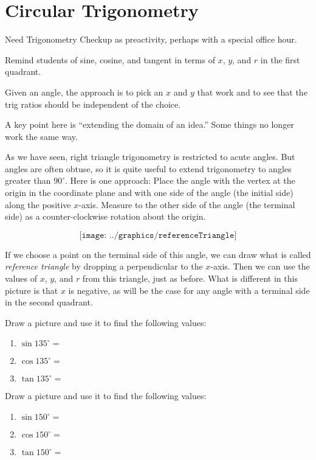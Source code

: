 \newpage 

\section{Circular Trigonometry}
\begin{teachingnote}
Need Trigonometry Checkup as preactivity, perhaps with a special office hour.  

Remind students of sine, cosine, and tangent in terms of $x$, $y$, and $r$ in the first quadrant.  

Given an angle, the approach is to pick an $x$ and $y$ that work and to see that the trig ratios should be independent of the choice.  

A key point here is ``extending the domain of an idea.''  Some things no longer work the same way.
\end{teachingnote}

As we have seen, right triangle trigonometry is restricted to acute angles.  But angles are often obtuse, so it is quite useful to extend trigonometry to angles greater than $90^\circ$.  Here is one approach:  Place the angle with the vertex at the origin in the coordinate plane and with one side of the angle (the initial side) along the positive $x$-axis.  
Measure to the other side of the angle (the terminal side) as a counter-clockwise rotation about the origin.   

\[
\texttt{[image: ../graphics/referenceTriangle]}
\]

If we choose a point on the terminal side of this angle, we can draw what is called \emph{reference triangle} by dropping a perpendicular to the $x$-axis.  Then we can use the values of $x$, $y$, and $r$ from this triangle, just as before.  What is different in this picture is that $x$ is negative, as will be the case for any angle with a terminal side in the second quadrant.  


\begin{prob}
Draw a picture and use it to find the following values: 
\begin{enumerate}
\item $\sin 135^\circ = $
\item $\cos 135^\circ =$
\item $\tan 135^\circ =$
\end{enumerate}
\end{prob}

\begin{prob}
Draw a picture and use it to find the following values: 
\begin{enumerate}
\item $\sin 150^\circ =$
\item $\cos 150^\circ =$
\item $\tan 150^\circ =$
\end{enumerate}
\end{prob}

